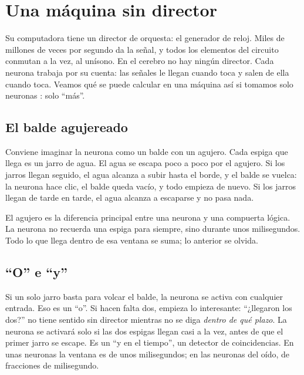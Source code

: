 \chapter{Una máquina sin director}

Su computadora tiene un director de orquesta: el generador de reloj. Miles de millones de veces por segundo da la señal, y todos los elementos del circuito conmutan a la vez, al unísono. En el cerebro no hay ningún director. Cada neurona trabaja por su cuenta: las señales le llegan cuando toca y salen de ella cuando toca. Veamos qué se puede calcular en una máquina así si tomamos solo neuronas : solo “más”.

\section*{El balde agujereado}

Conviene imaginar la neurona como un balde con un agujero. Cada espiga que llega es un jarro de agua. El agua se escapa poco a poco por el agujero. Si los jarros llegan seguido, el agua alcanza a subir hasta el borde, y el balde se vuelca: la neurona hace clic, el balde queda vacío, y todo empieza de nuevo. Si los jarros llegan de tarde en tarde, el agua alcanza a escaparse y no pasa nada.


El agujero es la diferencia principal entre una neurona y una compuerta lógica. La neurona no recuerda una espiga para siempre, sino durante unos milisegundos. Todo lo que llega dentro de esa ventana se suma; lo anterior se olvida.

\section*{“O” e “y”}

Si un solo jarro basta para volcar el balde, la neurona se activa con cualquier entrada. Eso es un “o”. Si hacen falta dos, empieza lo interesante: “¿llegaron los dos?” no tiene sentido sin director mientras no se diga \emph{dentro de qué plazo}. La neurona se activará solo si las dos espigas llegan casi a la vez, antes de que el primer jarro se escape. Es un “y en el tiempo”, un detector de coincidencias. En unas neuronas la ventana es de unos milisegundos; en las neuronas del oído, de fracciones de milisegundo.

